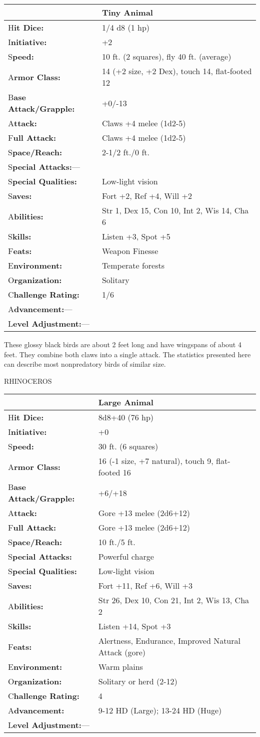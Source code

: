 \documentclass{article}
\begin{document}
\begin{tabular}{|>{\raggedright}p{91pt}|>{\raggedright}p{180pt}|}
\hline
  & Tiny Animal\tabularnewline
\hline
H\textbf{it Dice:} & 1/4 d8 (1 hp)\tabularnewline
\hline
I\textbf{nitiative:} & +2\tabularnewline
\hline
S\textbf{peed:} & 10 ft. (2 squares), fly 40 ft. (average)\tabularnewline
\hline
A\textbf{rmor Class:} & 14 (+2 size, +2 Dex), touch 14, flat-footed 12\tabularnewline
\hline
B\textbf{ase Attack/Grapple:} & +0/-13\tabularnewline
\hline
A\textbf{ttack:} & Claws +4 melee (1d2-5)\tabularnewline
\hline
F\textbf{ull Attack:} & Claws +4 melee (1d2-5)\tabularnewline
\hline
S\textbf{pace/Reach:} & 2-1/2 ft./0 ft.\tabularnewline
\hline
S\textbf{pecial Attacks:}--- & \tabularnewline
\hline
S\textbf{pecial Qualities:} & Low-light vision\tabularnewline
\hline
S\textbf{aves:} & Fort +2, Ref +4, Will +2\tabularnewline
\hline
A\textbf{bilities:} & Str 1, Dex 15, Con 10, Int 2, Wis 14, Cha 6\tabularnewline
\hline
S\textbf{kills:} & Listen +3, Spot +5\tabularnewline
\hline
F\textbf{eats:} & Weapon Finesse\tabularnewline
\hline
E\textbf{nvironment:} & Temperate forests\tabularnewline
\hline
O\textbf{rganization:} & Solitary\tabularnewline
\hline
C\textbf{hallenge Rating:} & 1/6\tabularnewline
\hline
A\textbf{dvancement:}--- & \tabularnewline
\hline
L\textbf{evel Adjustment:}--- & \tabularnewline
\hline
\end{tabular}

These glossy black birds are about 2 feet long and have wingspans of about 4 feet. 
They combine both claws into a single attack. The statistics presented here can 
describe most nonpredatory birds of similar size.

\vspace{12pt}
RHINOCEROS

\begin{tabular}{|>{\raggedright}p{91pt}|>{\raggedright}p{216pt}|}
\hline
  & Large Animal\tabularnewline
\hline
H\textbf{it Dice:} & 8d8+40 (76 hp)\tabularnewline
\hline
I\textbf{nitiative:} & +0\tabularnewline
\hline
S\textbf{peed:} & 30 ft. (6 squares)\tabularnewline
\hline
A\textbf{rmor Class:} & 16 (-1 size, +7 natural), touch 9, flat-footed 16\tabularnewline
\hline
B\textbf{ase Attack/Grapple:} & +6/+18\tabularnewline
\hline
A\textbf{ttack:} & Gore +13 melee (2d6+12)\tabularnewline
\hline
F\textbf{ull Attack:} & Gore +13 melee (2d6+12)\tabularnewline
\hline
S\textbf{pace/Reach:} & 10 ft./5 ft.\tabularnewline
\hline
S\textbf{pecial Attacks:} & Powerful charge\tabularnewline
\hline
S\textbf{pecial Qualities:} & Low-light vision\tabularnewline
\hline
S\textbf{aves:} & Fort +11, Ref +6, Will +3\tabularnewline
\hline
A\textbf{bilities:} & Str 26, Dex 10, Con 21, Int 2, Wis 13, Cha 2\tabularnewline
\hline
S\textbf{kills:} & Listen +14, Spot +3\tabularnewline
\hline
F\textbf{eats:} & Alertness, Endurance, Improved Natural Attack (gore)\tabularnewline
\hline
E\textbf{nvironment:} & Warm plains\tabularnewline
\hline
O\textbf{rganization:} & Solitary or herd (2-12)\tabularnewline
\hline
C\textbf{hallenge Rating:} & 4\tabularnewline
\hline
A\textbf{dvancement:} & 9-12 HD (Large); 13-24 HD (Huge)\tabularnewline
\hline
L\textbf{evel Adjustment:}--- & \tabularnewline
\hline
\end{tabular}
\end{document}
